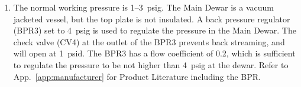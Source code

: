 \begin{enumerate}
    \item The normal working pressure is 1--3~psig. 
    The Main Dewar is a vacuum jacketed vessel, but the top plate is not insulated. 
    A back pressure regulator (BPR3) set to 4~psig is used to regulate the pressure in the Main Dewar.
    The check valve (CV4) at the outlet of the BPR3 prevents back streaming, and will open
    at 1~psid. 
    The BPR3 has a flow coefficient of 0.2, which is sufficient to regulate the pressure to 
    be not higher than 4~psig at the dewar. 
    Refer to App.~\ref{app:manufacturer} for Product Literature including the BPR.
\end{enumerate}
